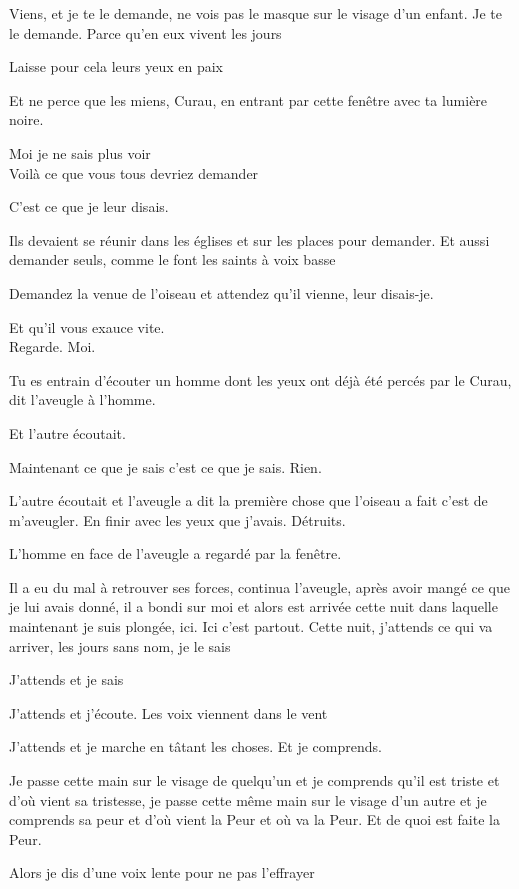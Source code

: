 Viens, et je te le demande, ne vois pas le masque sur le visage d'un
enfant. Je te le demande. Parce qu'en eux vivent les jours

Laisse pour cela leurs yeux en paix

Et ne perce que les miens, Curau, en entrant par cette fenêtre avec ta
lumière noire.

Moi je ne sais plus voir\\

Voilà ce que vous tous devriez demander

C'est ce que je leur disais.

Ils devaient se réunir dans les églises et sur les places pour demander.
Et aussi demander seuls, comme le font les saints à voix basse

Demandez la venue de l'oiseau et attendez qu'il vienne, leur disais-je.

Et qu'il vous exauce vite.\\

Regarde. Moi.

Tu es entrain d'écouter un homme dont les yeux ont déjà été percés par
le Curau, dit l'aveugle à l'homme.

Et l'autre écoutait.

Maintenant ce que je sais c'est ce que je sais. Rien.

L'autre écoutait et l'aveugle a dit la première chose que l'oiseau a
fait c'est de m'aveugler. En finir avec les yeux que j'avais. Détruits.

L'homme en face de l'aveugle a regardé par la fenêtre.

Il a eu du mal à retrouver ses forces, continua l'aveugle, après avoir
mangé ce que je lui avais donné, il a bondi sur moi et alors est arrivée
cette nuit dans laquelle maintenant je suis plongée, ici. Ici c'est
partout. Cette nuit, j'attends ce qui va arriver, les jours sans nom, je
le sais

J'attends et je sais

J'attends et j'écoute. Les voix viennent dans le vent

J'attends et je marche en tâtant les choses. Et je comprends.

Je passe cette main sur le visage de quelqu'un et je comprends qu'il est
triste et d'où vient sa tristesse, je passe cette même main sur le
visage d'un autre et je comprends sa peur et d'où vient la Peur et où va
la Peur. Et de quoi est faite la Peur.

Alors je dis d'une voix lente pour ne pas l'effrayer

